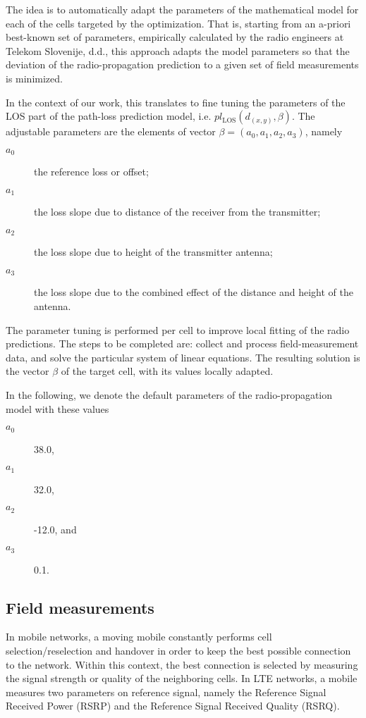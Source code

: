 The idea is to automatically adapt the parameters of the mathematical
model for each of the cells targeted by the optimization. That is,
starting from an a-priori best-known set of parameters, empirically
calculated by the radio engineers at Telekom Slovenije, d.d., this
approach adapts the model parameters so that the deviation of the
radio-propagation prediction to a given set of field measurements
is minimized.

In the context of our work, this translates to fine tuning the parameters
of the LOS part of the path-loss prediction model, i.e. $pl_{\mathrm{LOS}}(d_{(x,y)},\beta)$.
The adjustable parameters are the elements of vector $\beta=(a_{0},a_{1},a_{2},a_{3})$,
namely
\begin{description}
\item [{$a_{0}$}] the reference loss or offset;
\item [{$a_{1}$}] the loss slope due to distance of the receiver from
the transmitter;
\item [{$a_{2}$}] the loss slope due to height of the transmitter antenna;
\item [{$a_{3}$}] the loss slope due to the combined effect of the distance
and height of the antenna.
\end{description}
The parameter tuning is performed per cell to improve local fitting
of the radio predictions. The steps to be completed are: collect and
process field-measurement data, and solve the particular system of
linear equations. The resulting solution is the vector $\beta$ of
the target cell, with its values locally adapted.

In the following, we denote the default parameters of the radio-propagation
model with these values
\begin{description}
\item [{$a_{0}$}] 38.0,
\item [{$a_{1}$}] 32.0,
\item [{$a_{2}$}] -12.0, and
\item [{$a_{3}$}] 0.1.
\end{description}

\subsection{Field measurements}

In mobile networks, a moving mobile constantly performs cell selection/reselection
and handover in order to keep the best possible connection to the
network. Within this context, the best connection is selected by measuring
the signal strength or quality of the neighboring cells. In LTE networks,
a mobile measures two parameters on reference signal, namely the Reference
Signal Received Power (RSRP) and the Reference Signal Received Quality
(RSRQ).

